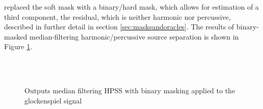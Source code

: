 \documentclass[report.tex]{subfiles}
\begin{document}
 
\textcite{driedger} replaced the soft mask with a binary/hard mask, which allows for estimation of a third component, the residual, which is neither harmonic nor percussive, described in further detail in section \ref{sec:masksandoracles}. The results of binary-masked median-filtering harmonic/percussive source separation is shown in Figure \ref{fig:fitz12}.

\begin{figure}[ht]
	\centering
	\\
	\\
	\caption{Outputs median filtering HPSS with binary masking applied to the glockenspiel signal}
	\label{fig:fitz12}
\end{figure}
\end{document}
